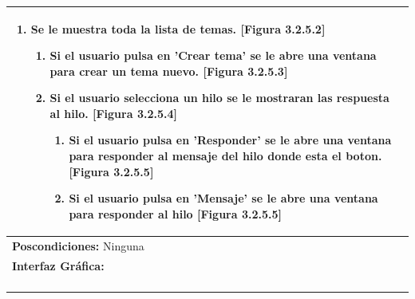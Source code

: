 \documentclass{report}
\begin{document}
\begin{center}
\begin{longtable}{|p{\linewidth}|}
\begin{enumerate}
                            \begin{enumerate}
                                \item Se le muestra toda la lista de temas. [Figura 3.2.5.2]
                                \begin{enumerate}
                                    \item Si el usuario pulsa en 'Crear tema' se le abre una ventana para crear un tema nuevo. [Figura 3.2.5.3]
                                    \item Si el usuario selecciona un hilo se le mostraran las respuesta al hilo. [Figura 3.2.5.4]
                                    \begin{enumerate}
                                        \item Si el usuario pulsa en 'Responder' se le abre una ventana para responder al mensaje del hilo donde esta el boton. [Figura 3.2.5.5]
                                        \item Si el usuario pulsa en 'Mensaje' se le abre una ventana para responder al hilo [Figura 3.2.5.5]
                                    \end{enumerate}
                                \end{enumerate}
                            \end{enumerate}
                        \end{enumerate}\\
                        \hline
                        \textbf{Poscondiciones:} Ninguna\\
                        \hline
                        \textbf{Interfaz Gráfica:}\\
                        \begin{figure}[H]
                            \centering

\end{figure}
\end{longtable}
\end{center}
\end{document}
